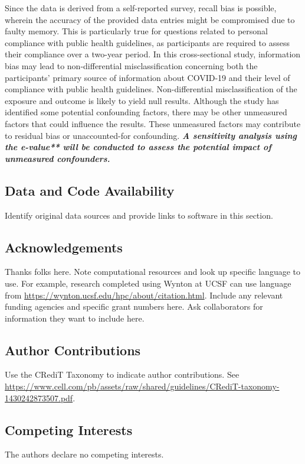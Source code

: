 \documentclass[11pt]{article} %
\begin{document}
Since the data is derived from a self-reported survey, recall bias is possible, wherein the accuracy of the provided data entries might be compromised due to faulty memory. This is particularly true for questions related to personal compliance with public health guidelines, as participants are required to assess their compliance over a two-year period. In this cross-sectional study, information bias may lead to non-differential misclassification concerning both the participants' primary source of information about COVID-19 and their level of compliance with public health guidelines. Non-differential misclassification of the exposure and outcome is likely to yield null results.
Although the study has identified some potential confounding factors, there may be other unmeasured factors that could influence the results. These unmeasured factors may contribute to residual bias or unaccounted-for confounding. \textbf{\textit{A sensitivity analysis using the e-value** will be conducted to assess the potential impact of unmeasured confounders.}} 

\subsection{Data and Code Availability}
Identify original data sources and provide links to software in this section.

\subsection{Acknowledgements}
Thanks folks here. Note computational resources and look up specific language to use. For example, research completed using Wynton at UCSF can use language from \url{https://wynton.ucsf.edu/hpc/about/citation.html}. Include any relevant funding agencies and specific grant numbers here. Ask collaborators for information they want to include here.

\subsection{Author Contributions}
Use the CRediT Taxonomy to indicate author contributions. See \url{https://www.cell.com/pb/assets/raw/shared/guidelines/CRediT-taxonomy-1430242873507.pdf}.

\subsection{Competing Interests}
The authors declare no competing interests.




    \begin{singlespace}
        \printbibliography
    \end{singlespace}
    \clearpage
    
\end{document}
